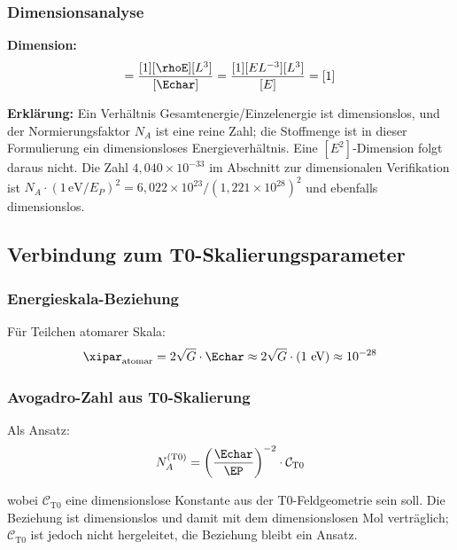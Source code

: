 	\subsubsection{Dimensionsanalyse}
	\label{subsubsec:mol_dimensionsanalyse}
	
	\textbf{Dimension:}
	\begin{equation}
		[n_{\text{T0}}] = \frac{[1][\rhoE][L^3]}{[\Echar]} = \frac{[1][E L^{-3}][L^3]}{[E]} = [1]
		\label{eq:mol_wahre_dimension}
	\end{equation}
	
	\textbf{Erklärung:} Ein Verhältnis Gesamtenergie/Einzelenergie ist dimensionslos, und der Normierungsfaktor $N_A$ ist eine reine Zahl; die Stoffmenge ist in dieser Formulierung ein dimensionsloses Energieverhältnis. Eine $[E^2]$-Dimension folgt daraus nicht. Die Zahl $4{,}040\times10^{-33}$ im Abschnitt zur dimensionalen Verifikation ist $N_A \cdot (1\,\text{eV}/E_P)^2 = 6{,}022\times10^{23}/(1{,}221\times10^{28})^2$ und ebenfalls dimensionslos.
	
	\subsection{Verbindung zum T0-Skalierungsparameter}
	\label{subsec:mol_t0_skalierung}
	
	\subsubsection{Energieskala-Beziehung}
	\label{subsubsec:mol_energieskala}
	
	Für Teilchen atomarer Skala:
	\begin{equation}
		\xipar_{\text{atomar}} = 2\sqrt{G} \cdot \Echar \approx 2\sqrt{G} \cdot (1 \text{ eV}) \approx 10^{-28}
		\label{eq:xi_atomar}
	\end{equation}
	
	\subsubsection{Avogadro-Zahl aus T0-Skalierung}
	\label{subsubsec:avogadro_t0}
	
	Als Ansatz:
	\begin{equation}
		N_A^{(\text{T0})} = \left(\frac{\Echar}{\EP}\right)^{-2} \cdot \mathcal{C}_{\text{T0}}
		\label{eq:avogadro_t0_vorhersage}
	\end{equation}
	
	wobei $\mathcal{C}_{\text{T0}}$ eine dimensionslose Konstante aus der T0-Feldgeometrie sein soll. Die Beziehung ist dimensionslos und damit mit dem dimensionslosen Mol verträglich; $\mathcal{C}_{\text{T0}}$ ist jedoch nicht hergeleitet, die Beziehung bleibt ein Ansatz.
	

